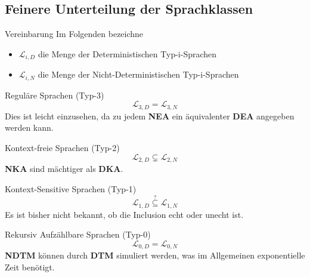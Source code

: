 \documentclass[]{beamer}
\begin{document}
\subsection{Feinere Unterteilung der Sprachklassen}
\begin{frame}[squeeze]{}
  \begin{alertblock}{Vereinbarung}
    Im Folgenden bezeichne
    \begin{itemize}
      \item $\mathcal{L}_{i, D}$ die Menge der Deterministischen Typ-i-Sprachen
      \item $\mathcal{L}_{i, N}$ die Menge der Nicht-Deterministischen Typ-i-Sprachen
    \end{itemize}
  \end{alertblock}
  
  \pause
  
  \begin{block}{Reguläre Sprachen (Typ-3)}
    \[\mathcal{L}_{3, D} = \mathcal{L}_{3, N}\]
    Dies ist leicht einzusehen, da zu jedem \textbf{NEA} ein äquivalenter \textbf{DEA} angegeben werden kann.
  \end{block}
\end{frame}

\begin{frame}[<+->][squeeze]{}  
  \begin{block}{Kontext-freie Sprachen (Typ-2)}
    \[\mathcal{L}_{2, D} \subsetneq \mathcal{L}_{2, N}\]
    \textbf{NKA} sind mächtiger als \textbf{DKA}.
  \end{block}
  
  \begin{block}{Kontext-Sensitive Sprachen (Typ-1)}
    \[\mathcal{L}_{1, D} \overset{?}{\subseteq} \mathcal{L}_{1, N}\]
    Es ist bisher nicht bekannt, ob die Inclusion echt oder unecht ist.
  \end{block}
  
  \begin{block}{Rekursiv Aufzählbare Sprachen (Typ-0)}
    \[\mathcal{L}_{0, D} = \mathcal{L}_{0, N}\]
    \textbf{NDTM} können durch \textbf{DTM} simuliert werden, was im Allgemeinen exponentielle Zeit benötigt.
  \end{block}
\end{frame}
\end{document}
